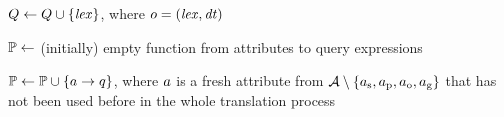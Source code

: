         {
		    $Q \gets Q \cup \{ \mathit{lex} \}$, where $o = (\mathit{lex},\mathit{dt})$ \;
        }
        \label{line:query_extraction:from_joins_end}

		$\mathbb{P} \gets$ (initially) empty function from attributes to query expressions \;

		{
			$\mathbb{P} \gets \mathbb{P} \cup \{ a \rightarrow q \}$, where $a$ is a fresh attribute from $\mathcal{A} \setminus \{ a_\textrm{s}, a_\textrm{p}, a_\textrm{o}, a_\textrm{g} \}$ that \hspace*{24mm} has not been used before in the whole translation process
		}

		\Return{$\symAttrQueryMap$}

